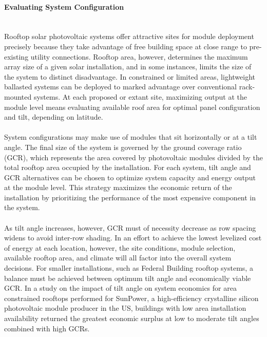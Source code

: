 \paragraph{Evaluating System Configuration}\mbox{ }\\
Rooftop solar photovoltaic systems offer attractive sites for module deployment precisely because they take advantage of free building space at close range to pre-existing utility connections. Rooftop area, however, determines the maximum array size of a given solar installation, and in some instances, limits the size of the system to distinct disadvantage. In constrained or limited areas, lightweight ballasted systems can be deployed to marked advantage over conventional rack-mounted systems. At each proposed or extant site, maximizing output at the module level means evaluating available roof area for optimal panel configuration and tilt, depending on latitude.
\\\\
\noindent System configurations may make use of modules that sit horizontally or at a tilt angle. The final size of the system is governed by the ground coverage ratio (GCR), which represents the area covered by photovoltaic modules divided by the total rooftop area occupied by the installation. For each system, tilt angle and GCR alternatives can be chosen to optimize system capacity and energy output at the module level. This strategy maximizes the economic return of the installation by prioritizing the performance of the most expensive component in the system.
\\\\
\noindent As tilt angle increases, however, GCR must of necessity decrease as row spacing widens to avoid inter-row shading. In an effort to achieve the lowest levelized cost of energy at each location, however, the site conditions, module selection, available rooftop area, and climate will all factor into the overall system decisions. For smaller installations, such as Federal Building rooftop systems, a balance must be achieved between optimum tilt angle and economically viable GCR. In a study on the impact of tilt angle on system economics for area constrained rooftops performed for SunPower, a high-efficiency crystalline silicon photovoltaic module producer in the US, buildings with low area installation availability returned the greatest economic surplus at low to moderate tilt angles combined with high GCRs.

